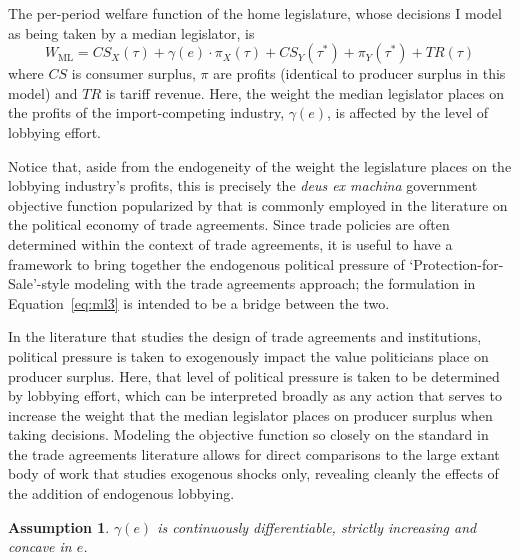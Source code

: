 \documentclass[authoryear, review]{elsarticle}
\newtheorem{assumption}{Assumption}
\newcommand{\ga}{\gamma}
\begin{document}

The per-period welfare function of the home legislature, whose decisions I model as being taken by a median legislator, is
\begin{equation}
  W_\text{ML} = \mathit{CS}_X(\tau) + \ga(e) \cdot \pi_X(\tau) + \mathit{CS}_Y(\tau^*) + \pi_Y(\tau^*) + \mathit{TR}(\tau)
  \label{eq:ml3}
\end{equation}
where $\mathit{CS}$ is consumer surplus, $\pi$ are profits (identical to producer surplus in this model) and $\mathit{TR}$ is tariff revenue. Here, the weight the median legislator places on the profits of the import-competing industry, $\ga(e)$, is affected by the level of lobbying effort.

Notice that, aside from the endogeneity of the weight the legislature places on the lobbying industry's profits, this is precisely the \textit{deus ex machina} government objective function popularized by \citet{baldwin} that is commonly employed in the literature on the political economy of trade agreements. Since trade policies are often determined within the context of trade agreements, it is useful to have a framework to bring together the endogenous political pressure of `Protection-for-Sale'-style modeling with the trade agreements approach; the formulation in Equation~\ref{eq:ml3} is intended to be a bridge between the two. 

In the literature that studies the design of trade agreements and institutions, political pressure is taken to exogenously impact the value politicians place on producer surplus. Here, that level of political pressure is taken to be determined by lobbying effort, which can be interpreted broadly as any action that serves to increase the weight that the median legislator places on producer surplus when taking decisions. Modeling the objective function so closely on the standard in the trade agreements literature allows for direct comparisons to the large extant body of work that studies exogenous shocks only, revealing cleanly the effects of the addition of endogenous lobbying.

\begin{assumption}
  $\ga(e)$ is continuously differentiable, strictly increasing and concave in $e$.
  \label{as:ga_c3}
\end{assumption}
\end{document}
